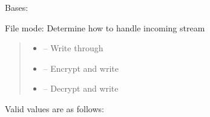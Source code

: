 \documentclass[letterpaper,10pt,english]{sphinxmanual}
\begin{document}
\begin{savenotes}\begin{fulllineitems}
\label{\detokenize{eezz:eezz.filesrv.TFileMode}}
\pysigstartsignatures
{}
\pysigstopsignatures
\sphinxAtStartPar
Bases: 

\sphinxAtStartPar
File mode: Determine how to handle incoming stream
\begin{quote}\begin{description}
\begin{itemize}
\item {} 
\sphinxAtStartPar
{} – Write through

\item {} 
\sphinxAtStartPar
{} – Encrypt and write

\item {} 
\sphinxAtStartPar
{} – Decrypt and write

\end{itemize}

\end{description}\end{quote}

\sphinxAtStartPar
Valid values are as follows:

\begin{savenotes}\begin{fulllineitems}
\label{\detokenize{eezz:eezz.filesrv.TFileMode.NORMAL}}
\pysigstartsignatures
{}
\pysigstopsignatures
\end{fulllineitems}\end{savenotes}


\begin{savenotes}\begin{fulllineitems}
\label{\detokenize{eezz:eezz.filesrv.TFileMode.ENCRYPT}}
\pysigstartsignatures
{}
\pysigstopsignatures
\end{fulllineitems}\end{savenotes}


\end{fulllineitems}
\end{savenotes}
\end{document}
